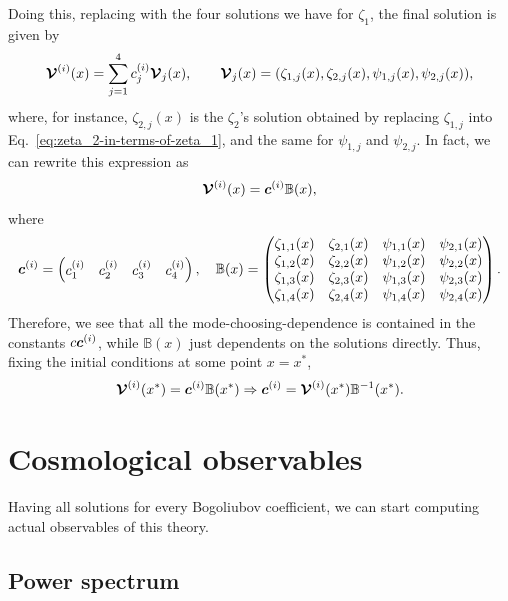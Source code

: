 \documentclass[
 aip,
 jmp,
 amsmath,amssymb,
 reprint,
 nofootinbib,
]{revtex4-2}
\def\mV{{\vb*{\mathcal{V}}}}
\begin{document}
Doing this, replacing with the four solutions we have for $\zeta_1$, the final solution is given by
\begin{equation}
    \vb*{\mathcal{V}}^{(i)}(x) = \sum_{j = 1}^4 c_j^{(i)} \mV_j(x), \qquad \mV_j(x) = \qty(\zeta_{1,j}(x), \zeta_{2,j}(x), \psi_{1,j}(x), \psi_{2,j}(x)), %
    \label{eq:vector-solution-general}
\end{equation}
where, for instance, $\zeta_{2,j}(x)$ is the $\zeta_2$'s solution obtained by replacing $\zeta_{1,j}$ into Eq.~\eqref{eq:zeta_2-in-terms-of-zeta_1}, and the same for $\psi_{1,j}$ and $\psi_{2,j}$. In fact, we can rewrite this expression as
\begin{equation}
    \mV^{(i)}(x) = \vb*{c}^{(i)} \mathbb{B}(x),
\end{equation}
where
\begin{equation}
    \vb*{c}^{(i)} = \begin{pmatrix} c_1^{(i)} & c_2^{(i)} & c_3^{(i)} & c_4^{(i)}\end{pmatrix}, \quad \mathbb{B}(x) = \begin{pmatrix}
        \zeta_{1,1}(x) & \zeta_{2,1}(x) & \psi_{1,1}(x) & \psi_{2,1}(x) \\
        \zeta_{1,2}(x) & \zeta_{2,2}(x) & \psi_{1,2}(x) & \psi_{2,2}(x) \\
        \zeta_{1,3}(x) & \zeta_{2,3}(x) & \psi_{1,3}(x) & \psi_{2,3}(x) \\
        \zeta_{1,4}(x) & \zeta_{2,4}(x) & \psi_{1,4}(x) & \psi_{2,4}(x)
    \end{pmatrix}.
\end{equation}
Therefore, we see that all the mode-choosing-dependence is contained in the constants $c\vb*{c}^{(i)}$, while $\mathbb{B}(x)$ just dependents on the solutions directly. Thus, fixing the initial conditions at some point $x = x^*$,
\begin{align}
    \mV^{(i)}(x^*) = \vb*{c}^{(i)} \mathbb{B}(x^*) \Rightarrow \vb*{c}^{(i)} = \mV^{(i)}(x^*) \mathbb{B}^{-1}(x^*).%
    \label{eq:general-eq-solution-for-constants}
\end{align}

\section{Cosmological observables}

Having all solutions for every Bogoliubov coefficient, we can start computing actual observables of this theory.

\subsection{Power spectrum}
\end{document}
